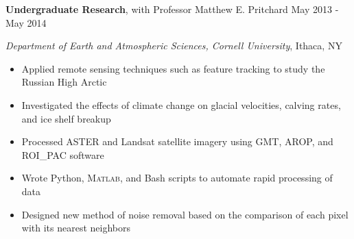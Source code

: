 

\textbf{Undergraduate Research}, with Professor Matthew E. Pritchard \hfill May 2013 - May 2014

\textit{Department of Earth and Atmospheric Sciences, Cornell University}, Ithaca, NY

\begin{itemize}
    \item Applied remote sensing techniques such as feature tracking to study the Russian High Arctic
    \item Investigated the effects of climate change on glacial velocities, calving rates, and ice shelf breakup
    \item Processed ASTER and Landsat satellite imagery using GMT, AROP, and ROI\_PAC software
    \item Wrote Python, \textsc{Matlab}, and Bash scripts to automate rapid processing of data
    \item Designed new method of noise removal based on the comparison of each pixel with its nearest neighbors
\end{itemize}
